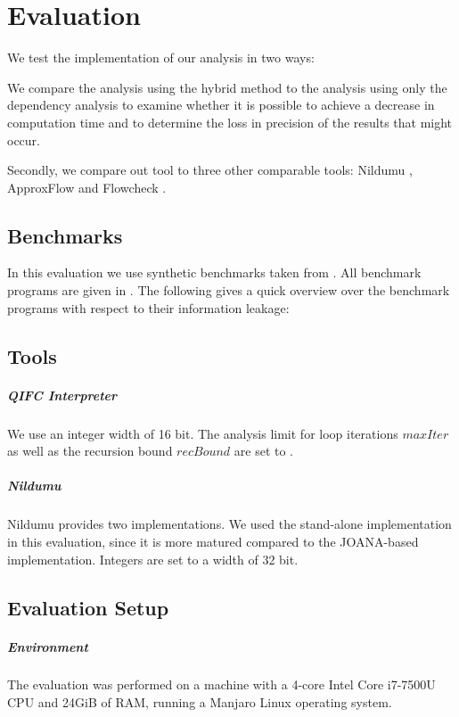 \chapter{Evaluation}\label{sec:eval}
We test the implementation of our analysis in two ways:

We compare the analysis using the hybrid method to the analysis using only the dependency analysis to examine whether it is possible to achieve a decrease in computation time and to determine the loss in precision of the results that might occur.

Secondly, we compare out tool to three other comparable tools: Nildumu \cite{bechberger18}, ApproxFlow \cite{biondi18} and Flowcheck \cite{mccamant08}.

\section{Benchmarks}
In this evaluation we use synthetic benchmarks taken from . All benchmark programs are given in . The following gives a quick overview over the benchmark programs with respect to their information leakage:

\section{Tools}

\paragraph{QIFC Interpreter}
We use an integer width of 16 bit. The analysis limit for loop iterations $maxIter$ as well as the recursion bound $recBound$ are set to .

\paragraph{Nildumu}
Nildumu provides two implementations. We used the stand-alone implementation in this evaluation, since it is more matured compared to the JOANA-based implementation. Integers are set to a width of 32 bit.

\section{Evaluation Setup}

\paragraph{Environment}
The evaluation was performed on a machine with a 4-core Intel Core i7-7500U CPU and 24GiB of RAM, running a Manjaro Linux operating system.

